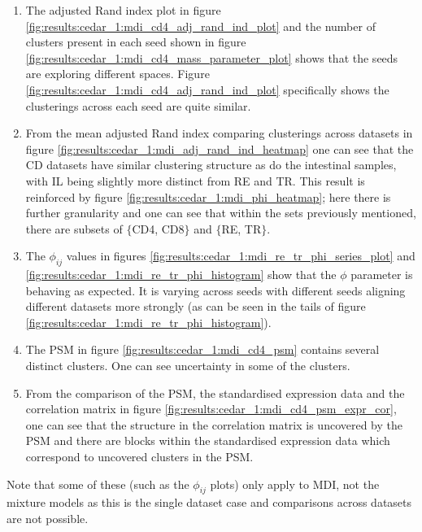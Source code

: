 \documentclass[12pt]{article} %
\begin{document}
	\begin{enumerate}
		\item The adjusted Rand index plot in figure \ref{fig:results:cedar_1:mdi_cd4_adj_rand_ind_plot} and the number of clusters present in each seed shown in figure \ref{fig:results:cedar_1:mdi_cd4_mass_parameter_plot} shows that the seeds are exploring different spaces. Figure \ref{fig:results:cedar_1:mdi_cd4_adj_rand_ind_plot} specifically shows the clusterings across each seed are quite similar.
		\item From the mean adjusted Rand index comparing clusterings across datasets in figure \ref{fig:results:cedar_1:mdi_adj_rand_ind_heatmap} one can see that the CD datasets have similar clustering structure as do the intestinal samples, with IL being slightly more distinct from RE and TR. This result is reinforced by figure \ref{fig:results:cedar_1:mdi_phi_heatmap}; here there is further granularity and one can see that within the sets previously mentioned, there are subsets of $\{$CD4, CD8$\}$ and $\{$RE, TR$\}$.
		\item The $\phi_{ij}$ values in figures \ref{fig:results:cedar_1:mdi_re_tr_phi_series_plot} and \ref{fig:results:cedar_1:mdi_re_tr_phi_histogram} show that the $\phi$ parameter is behaving as expected. It is varying across seeds with different seeds aligning different datasets more strongly (as can be seen in the tails of figure \ref{fig:results:cedar_1:mdi_re_tr_phi_histogram}).
		\item The PSM in figure \ref{fig:results:cedar_1:mdi_cd4_psm} contains several distinct clusters. One can see uncertainty in some of the clusters.
		\item From the comparison of the PSM, the standardised expression data and the correlation matrix in figure \ref{fig:results:cedar_1:mdi_cd4_psm_expr_cor}, one can see that the structure in the correlation matrix is uncovered by the PSM and there are blocks within the standardised expression data which correspond to uncovered clusters in the PSM. %
	\end{enumerate}
	Note that some of these (such as the $\phi_{ij}$ plots) only apply to MDI, not the mixture models as this is the single dataset case and comparisons across datasets are not possible.
\end{document}
